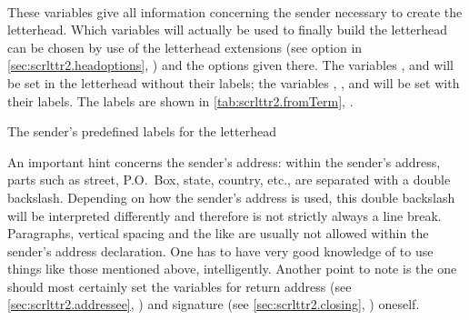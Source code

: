 \begin{Declaration}
  \\
  \\
  \\
  \\
  \\
  \\
\end{Declaration}
%
%
%
%
%
%
%
%
These variables give all information concerning the sender necessary
to create the letterhead. Which variables will actually be used to
finally build the letterhead can be chosen by use of the letterhead
extensions (see option  in
\autoref{sec:scrlttr2.headoptions},
) and the options given
there. The variables ,  and
 will be set in the letterhead without their
labels; the variables , ,
 and  will be set with their
labels. The labels are shown in \autoref{tab:scrlttr2.fromTerm},
.
%
\begin{table}
  \centering
  \caption{The sender's predefined labels for the letterhead}
  \begin{desctabular}[1.8em]
  \end{desctabular}
\label{tab:scrlttr2.fromTerm}
\end{table}

An important hint concerns the sender's address: within the sender's
address, parts such as street, P.O.~Box, state, country, etc., are
separated with a double backslash. Depending on how the sender's
address is used, this double backslash will be interpreted differently
and therefore is not strictly always a line break. Paragraphs,
vertical spacing and the like are usually not allowed within the
sender's address declaration. One has to have very good knowledge of
 to use things like those mentioned above,
intelligently. Another point to note is the one should most certainly
set the variables for return address (see
\autoref{sec:scrlttr2.addressee},
) and signature (see
\autoref{sec:scrlttr2.closing},
) oneself.


